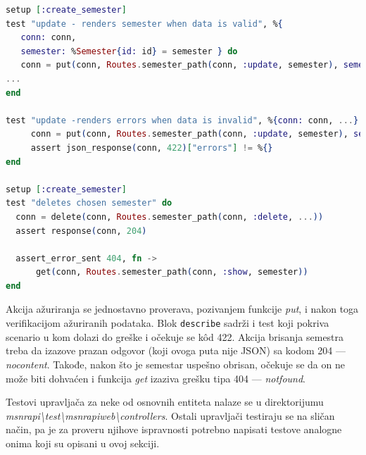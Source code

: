 \documentclass[12pt,oneside]{memoir}
\begin{document}
\begin{minipage}{\linewidth}
\begin{lstlisting}[language=elixir, basicstyle=\small, caption={Testiranje akcije \emph{update} i \emph{delete} upravljača \emph{SemesterController}},captionpos=b, label={lst:updatedelete}]
setup [:create_semester]
test "update - renders semester when data is valid", %{
   conn: conn,
   semester: %Semester{id: id} = semester } do
   conn = put(conn, Routes.semester_path(conn, :update, semester), semester: @attrs)
...
end

test "update -renders errors when data is invalid", %{conn: conn, ...} do
     conn = put(conn, Routes.semester_path(conn, :update, semester), semester: @invalid_attrs)
     assert json_response(conn, 422)["errors"] != %{}
end

setup [:create_semester]
test "deletes chosen semester" do 
  conn = delete(conn, Routes.semester_path(conn, :delete, ...))
  assert response(conn, 204)
     
  assert_error_sent 404, fn ->
      get(conn, Routes.semester_path(conn, :show, semester))
end
\end{lstlisting}
\end{minipage}


\par Akcija ažuriranja se jednostavno proverava, pozivanjem funkcije \emph{put}, i nakon toga verifikacijom ažuriranih podataka. Blok \texttt{describe} sadrži i test koji pokriva scenario u kom dolazi do greške i očekuje se  k\^{o}d 422. Akcija brisanja semestra treba da izazove prazan odgovor (koji ovoga puta nije JSON) sa kodom 204 --- \emph{no{\textunderscore}content}. Takođe, nakon što je semestar uspešno obrisan, očekuje se da on ne može biti dohvaćen i funkcija \emph{get} izaziva grešku tipa 404 --- \emph{not{\textunderscore}found}.
\par Testovi upravljača za neke od osnovnih entiteta nalaze se u direktorijumu \\ \emph{msnr{\textunderscore}api{\textbackslash}test{\textbackslash}msnr{\textunderscore}api{\textunderscore}web{\textbackslash}controllers}. Ostali upravljači testiraju se na sličan način, pa je za proveru njihove ispravnosti potrebno napisati testove analogne onima koji su  opisani u ovoj sekciji.  
\end{document}
